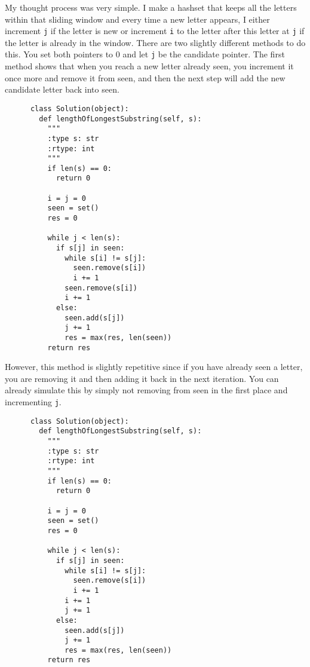 \documentclass{article}
\begin{document}
  \begin{example}
    My thought process was very simple. I make a hashset that keeps all the letters within that sliding window and every time a new letter appears, I either increment \texttt{j} if the letter is new or increment \texttt{i} to the letter after this letter at \texttt{j} if the letter is already in the window. There are two slightly different methods to do this. You set both pointers to 0 and let \texttt{j} be the candidate pointer. The first method shows that when you reach a new letter already seen, you increment it once more and remove it from seen, and then the next step will add the new candidate letter back into seen.   
    \begin{lstlisting}
      class Solution(object):
        def lengthOfLongestSubstring(self, s):
          """
          :type s: str
          :rtype: int
          """
          if len(s) == 0: 
            return 0 

          i = j = 0
          seen = set() 
          res = 0

          while j < len(s): 
            if s[j] in seen: 
              while s[i] != s[j]: 
                seen.remove(s[i]) 
                i += 1 
              seen.remove(s[i]) 
              i += 1 
            else: 
              seen.add(s[j])
              j += 1 
              res = max(res, len(seen))
          return res
    \end{lstlisting}
    However, this method is slightly repetitive since if you have already seen a letter, you are removing it and then adding it back in the next iteration. You can already simulate this by simply not removing from seen in the first place and incrementing \texttt{j}. 
    \begin{lstlisting}
      class Solution(object):
        def lengthOfLongestSubstring(self, s):
          """
          :type s: str
          :rtype: int
          """
          if len(s) == 0: 
            return 0 

          i = j = 0
          seen = set() 
          res = 0

          while j < len(s): 
            if s[j] in seen: 
              while s[i] != s[j]: 
                seen.remove(s[i]) 
                i += 1 
              i += 1 
              j += 1
            else: 
              seen.add(s[j])
              j += 1 
              res = max(res, len(seen))
          return res
    \end{lstlisting}
  \end{example}
\end{document}
